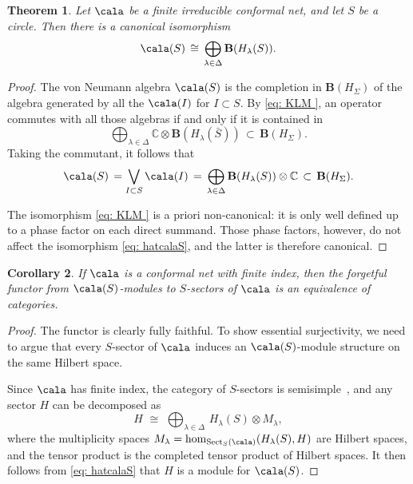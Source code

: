 \documentclass[a4paper,10pt,leqno]{amsart}
\newcommand{\thmKLallirreduciblesectorsarefinite}{Thm.~3.14}
\newcommand{\IC}{\mathbb{C}}     \newcommand{\calc}{\mathcal{C}}
\newcommand{\bfB}{{\mathbf B}}   \newcommand{\sfB}{{\mathsf{B}}}
\theoremstyle{plain}
\newtheorem{theorem}{Theorem}[section]
\newtheorem{corollary}[theorem]{Corollary}
\theoremstyle{definition}
\theoremstyle{remark}
\DeclareMathOperator{\Rep}{Sect}
\begin{document}
\begin{theorem} \label{thm:compute-bfB(net)}
Let $\cala$ be a finite irreducible conformal net, and let $S$ be a circle.
Then there is a canonical isomorphism
\begin{equation}\label{eq: hatcalaS}
\cala(S) \,\cong\, \bigoplus_{\lambda\in\Delta} \bfB(H_\lambda(S)).
\end{equation}
\end{theorem}

\begin{proof}
The von Neumann algebra $\cala(S)$ is the completion in $\bfB(H_\Sigma)$
of the algebra generated by all the $\cala(I)$ for $I\subset S$.
By \eqref{eq:   KLM  }, an operator commutes with all those algebras if and only if it is contained in 
\[
\bigoplus_{\lambda\in\Delta}  \IC\otimes \bfB(H_\lambda(\bar S))\,\subset\, \bfB(H_{\Sigma}).
\]
Taking the commutant, it follows that 
\begin{equation}\label{eq: canonical? -- 2}
\cala(S)\,=\bigvee_{I\subset S}\cala(I) \,=\, \bigoplus_{\lambda\in\Delta} \bfB(H_\lambda(S)) \otimes \IC\,\subset\, \bfB(H_{\Sigma}).
\end{equation}

The isomorphism \eqref{eq:   KLM  } is a priori non-canonical: it is only well defined up to a phase factor on each direct summand.
Those phase factors, however, do not affect the isomorphism \eqref{eq: hatcalaS}, and the latter is therefore canonical.
\end{proof}

\begin{corollary}\label{cor: S-sector == A(S)-module}
If $\cala$ is a conformal net with finite index, then the forgetful functor from $\cala(S)$-modules to $S$-sectors of $\cala$
is an equivalence of categories.
\end{corollary} 

\begin{proof}
The functor is clearly fully faithful.
To show essential surjectivity, we need to argue
that every $S$-sector of $\cala$ induces an $\cala(S)$-module structure on the same Hilbert space.

Since $\cala$ has finite index, the category of $S$-sectors is 
semisimple~\cite[\thmKLallirreduciblesectorsarefinite]{BDH(nets)},
and any sector $H$ can be decomposed as
\begin{equation}\label{eq: sum decomposition of arbitrary sector*}
H \,\,\cong\,\, \bigoplus_{\lambda\in \Delta}\, H_\lambda(S)\otimes M_\lambda,
\end{equation}
where the multiplicity spaces $M_\lambda=\hom_{\Rep_S(\cala)}(H_\lambda(S),H)$ are Hilbert spaces, and the tensor product is the completed tensor product of Hilbert spaces.
It then follows from \eqref{eq: hatcalaS} that $H$ is a module for $\cala(S)$.
\end{proof}
\end{document}
